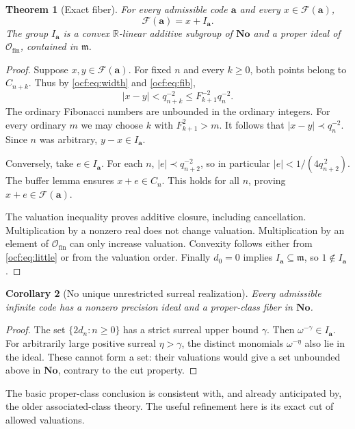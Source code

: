 \documentclass[11pt,a4paper]{article}
\numberwithin{equation}{section}
\newtheorem{theorem}{Theorem}[section]
\newtheorem{corollary}[theorem]{Corollary}
\theoremstyle{definition}
\theoremstyle{remark}
\newcommand{\No}{\mathbf{No}}
\newcommand{\R}{\mathbb R}
\newcommand{\Ofin}{\mathcal O_{\mathrm{fin}}}%
\newcommand{\mm}{\mathfrak m}
\newcommand{\F}{\mathcal F}
\newcommand{\codea}{\boldsymbol a}
\begin{document}
\begin{theorem}[Exact fiber]\label{ocf:thm:fiber}
For every admissible code $\codea$ and every $x\in\F(\codea)$,
\begin{equation}\label{ocf:eq:fiber}
 \boxed{\ \F(\codea)=x+I_{\codea}.\ }
\end{equation}
The group $I_{\codea}$ is a convex $\R$-linear additive subgroup of $\No$
and a proper ideal of $\Ofin$, contained in $\mm$.
\end{theorem}
\begin{proof}
Suppose $x,y\in\F(\codea)$. For fixed $n$ and every $k\ge0$, both points
belong to $C_{n+k}$. Thus by \eqref{ocf:eq:width} and \eqref{ocf:eq:fib},
\[
 |x-y|<q_{n+k}^{-2}\le F_{k+1}^{-2}q_n^{-2}.
\]
The ordinary Fibonacci numbers are unbounded in the ordinary integers.
For every ordinary $m$ we may choose $k$ with $F_{k+1}^2>m$. It follows
that $|x-y|\prec q_n^{-2}$. Since $n$ was arbitrary, $y-x\in I_{\codea}$.

Conversely, take $e\in I_{\codea}$. For each $n$,
$|e|\prec q_{n+2}^{-2}$, so in particular
$|e|<1/(4q_{n+2}^{\,2})$. The buffer lemma ensures $x+e\in C_n$.
This holds for all $n$, proving $x+e\in\F(\codea)$.

The valuation inequality proves additive closure, including cancellation.
Multiplication by a nonzero real does not change valuation. Multiplication
by an element of $\Ofin$ can only increase valuation. Convexity follows
either from \eqref{ocf:eq:little} or from the valuation order. Finally $d_0=0$
implies $I_{\codea}\subseteq\mm$, so $1\notin I_{\codea}$.
\end{proof}

\begin{corollary}[No unique unrestricted surreal realization]
\label{ocf:cor:neverunique}
Every admissible infinite code has a nonzero precision ideal and a
proper-class fiber in $\No$.
\end{corollary}
\begin{proof}
The set $\{2d_n:n\ge0\}$ has a strict surreal upper bound $\gamma$.
Then $\omega^{-\gamma}\in I_{\codea}$. For arbitrarily large positive
surreal $\eta>\gamma$, the distinct monomials $\omega^{-\eta}$ also lie
in the ideal. These cannot form a set: their valuations would give a
set unbounded above in $\No$, contrary to the cut property.
\end{proof}

The basic proper-class conclusion is consistent with, and already
anticipated by, the older associated-class theory. The useful refinement
here is its exact cut of allowed valuations.
\end{document}
